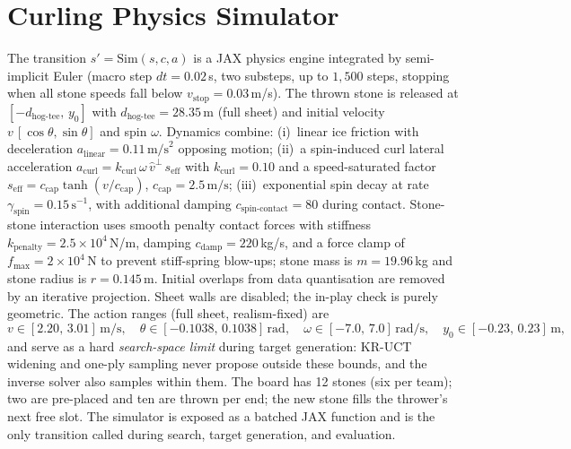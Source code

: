 \documentclass[11pt]{article}
\begin{document}
\section{Curling Physics Simulator}
\label{app:sim}
The transition $s'=\mathrm{Sim}(s,c,a)$ is a JAX physics engine integrated by
semi-implicit Euler (macro step $dt=0.02$\,s, two substeps, up to $1{,}500$
steps, stopping when all stone speeds fall below $v_{\text{stop}}=0.03$\,m/s).
The thrown stone is released at $[-d_{\text{hog-tee}},\,y_0]$ with
$d_{\text{hog-tee}}=28.35$\,m (full sheet) and initial velocity
$v\,[\cos\theta,\sin\theta]$ and spin $\omega$. Dynamics combine:
(i)~linear ice friction with deceleration $a_{\text{linear}}=0.11\,\text{m/s}^2$
opposing motion;
(ii)~a spin-induced curl lateral acceleration
$a_{\text{curl}} = k_{\text{curl}}\,\omega\,\hat v^\perp\,s_{\text{eff}}$
with $k_{\text{curl}}=0.10$ and a speed-saturated factor
$s_{\text{eff}}=c_{\text{cap}}\tanh(v/c_{\text{cap}})$,
$c_{\text{cap}}=2.5\,\text{m/s}$;
(iii)~exponential spin decay at rate $\gamma_{\text{spin}}=0.15\,\text{s}^{-1}$,
with additional damping $c_{\text{spin-contact}}=80$ during contact.
Stone-stone interaction uses smooth penalty contact forces with stiffness
$k_{\text{penalty}}=2.5\!\times\!10^{4}$\,N/m, damping
$c_{\text{damp}}=220$\,kg/s, and a force clamp of $f_{\max}=2\!\times\!10^{4}$\,N
to prevent stiff-spring blow-ups; stone mass is $m=19.96$\,kg and stone
radius is $r=0.145$\,m. Initial overlaps from data quantisation are removed
by an iterative projection. Sheet walls are disabled; the in-play check is
purely geometric. The action ranges (full sheet, realism-fixed) are
\[
v\in[2.20,\,3.01]\,\text{m/s},\quad
\theta\in[-0.1038,\,0.1038]\,\text{rad},\quad
\omega\in[-7.0,\,7.0]\,\text{rad/s},\quad
y_0\in[-0.23,\,0.23]\,\text{m},
\]
and serve as a hard \emph{search-space limit} during target generation:
KR-UCT widening and one-ply sampling never propose outside these bounds, and
the inverse solver also samples within them. The board has 12 stones (six
per team); two are pre-placed and ten are thrown per end; the new stone
fills the thrower's next free slot. The simulator is exposed as a batched
JAX function and is the only transition called during search, target
generation, and evaluation.
\end{document}
